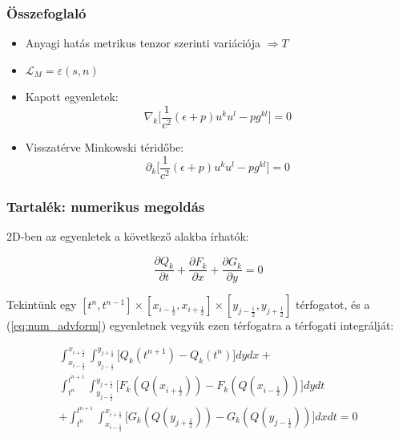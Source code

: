 \documentclass{beamer}
\begin{document}
\begin{frame}
\frametitle{Összefoglaló}
\begin{itemize}
  \setlength{\itemsep}{20pt}
\item Anyagi hatás metrikus tenzor szerinti variációja $\Rightarrow T$
\item $\mathcal{L}_M = \varepsilon(s,n)$
\item Kapott egyenletek:
\begin{equation}
\nabla_k \bigg[\frac{1}{c^2}(\epsilon+p)u^ku^l-pg^{kl}\bigg] = 0
\end{equation}
\item Visszatérve Minkowski téridőbe:
\begin{equation}
\partial_k \bigg[\frac{1}{c^2}(\epsilon+p)u^ku^l-pg^{kl}\bigg] = 0
\end{equation}
\end{itemize}
\end{frame}


\begin{frame}[noframenumbering]
\frametitle{Tartalék: numerikus megoldás}
2D-ben az egyenletek a következő alakba írhatók:
\begin{large}
\begin{equation}
\frac{\partial Q_k}{\partial t} + \frac{\partial F_k}{\partial x} + \frac{\partial G_k}{\partial y} = 0
\label{eq:num_advform}
\end{equation}

Tekintünk egy $[t^n, t^{n-1}]\times [x_{i-\frac{1}{2}}, x_{i+\frac{1}{2}}]\times [y_{j-\frac{1}{2}}, y_{j+\frac{1}{2}}]$ térfogatot, és a (\ref{eq:num_advform}) egyenletnek vegyük ezen térfogatra a térfogati integrálját:

\end{large}
\begin{multline}
\int_{x_{i-\frac{1}{2}}}^{x_{i+\frac{1}{2}}}\int_{y_{j-\frac{1}{2}}}^{y_{j+\frac{1}{2}}} \big[Q_k(t^{n+1})-Q_k(t^n)\big]dydx +  \\
\int_{t^n}^{t^{n+1}}\int_{y_{j-\frac{1}{2}}}^{y_{j+\frac{1}{2}}}\big[F_k(Q(x_{i+\frac{1}{2}}))-F_k(Q(x_{i-\frac{1}{2}}))\big]dydt
 \\
+\int_{t^n}^{t^{n+1}}\int_{x_{i-\frac{1}{2}}}^{x_{i+\frac{1}{2}}}\big[G_k(Q(y_{j+\frac{1}{2}}))-G_k(Q( y_{j-\frac{1}{2}}))\big]dxdt= 0
\label{eq:nfvmint1}
\end{multline}

\end{frame}
\end{document}
